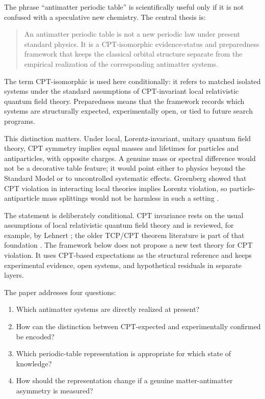 \documentclass[11pt,a4paper]{article}
\begin{document}
The phrase \enquote{antimatter periodic table} is scientifically useful only if it is not confused with a speculative new chemistry. The central thesis is:

\begin{quote}
An antimatter periodic table is not a new periodic law under present standard physics. It is a CPT-isomorphic evidence-status and preparedness framework that keeps the classical orbital structure separate from the empirical realization of the corresponding antimatter systems.
\end{quote}

The term CPT-isomorphic is used here conditionally: it refers to matched isolated systems under the standard assumptions of CPT-invariant local relativistic quantum field theory. Preparedness means that the framework records which systems are structurally expected, experimentally open, or tied to future search programs.

This distinction matters. Under local, Lorentz-invariant, unitary quantum field theory, CPT symmetry implies equal masses and lifetimes for particles and antiparticles, with opposite charges. A genuine mass or spectral difference would not be a decorative table feature; it would point either to physics beyond the Standard Model or to uncontrolled systematic effects. Greenberg showed that CPT violation in interacting local theories implies Lorentz violation, so particle-antiparticle mass splittings would not be harmless in such a setting \cite{Greenberg2002}.

The statement is deliberately conditional. CPT invariance rests on the usual assumptions of local relativistic quantum field theory and is reviewed, for example, by Lehnert \cite{Lehnert2016}; the older TCP/CPT theorem literature is part of that foundation \cite{Luders1957}. The framework below does not propose a new test theory for CPT violation. It uses CPT-based expectations as the structural reference and keeps experimental evidence, open systems, and hypothetical residuals in separate layers.

The paper addresses four questions:

\begin{enumerate}
  \item Which antimatter systems are directly realized at present?
  \item How can the distinction between CPT-expected and experimentally confirmed be encoded?
  \item Which periodic-table representation is appropriate for which state of knowledge?
  \item How should the representation change if a genuine matter-antimatter asymmetry is measured?
\end{enumerate}
\end{document}
